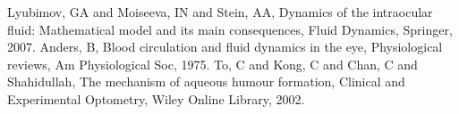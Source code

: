 \begin{thebibliography}{99}
Lyubimov, GA and Moiseeva, IN and Stein, AA, Dynamics of the intraocular fluid: Mathematical model and its main consequences, Fluid Dynamics, Springer, 2007.
 Anders, B, Blood circulation and fluid dynamics in the eye, Physiological reviews, Am Physiological Soc, 1975.
To, C and Kong, C and Chan, C and Shahidullah, The mechanism of aqueous humour formation, Clinical and Experimental Optometry, Wiley Online Library, 2002.


\end{thebibliography}